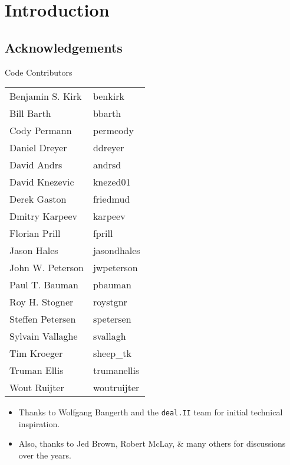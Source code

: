




\section{Introduction}

\subsection{Acknowledgements}
\begin{frame}[shrink]
  \begin{block}{Code Contributors}
    \scriptsize
    \begin{center}
      \begin{tabular}{|l|l|} \hline
        Benjamin S. Kirk & benkirk \\
        Bill Barth       & bbarth \\
        Cody Permann     & permcody \\
        Daniel Dreyer    & ddreyer \\
        David Andrs      & andrsd \\
        David Knezevic   & knezed01 \\
        Derek Gaston     & friedmud \\
        Dmitry Karpeev   & karpeev \\
        Florian Prill    & fprill \\
        Jason Hales      & jasondhales \\
        John W. Peterson & jwpeterson \\
        Paul T. Bauman   & pbauman \\
        Roy H. Stogner   & roystgnr \\
        Steffen Petersen & spetersen \\
        Sylvain Vallaghe & svallagh \\
        Tim Kroeger      & sheep\_tk \\
        Truman Ellis     & trumanellis \\
        Wout Ruijter     & woutruijter \\ \hline
      \end{tabular}
    \end{center}
    \begin{itemize}
      \item Thanks to Wolfgang Bangerth and the \texttt{deal.II} team for initial technical inspiration. 
      \item Also, thanks to Jed Brown, Robert McLay, \& many others for discussions over the years.
    \end{itemize}
  \end{block}
\end{frame}

